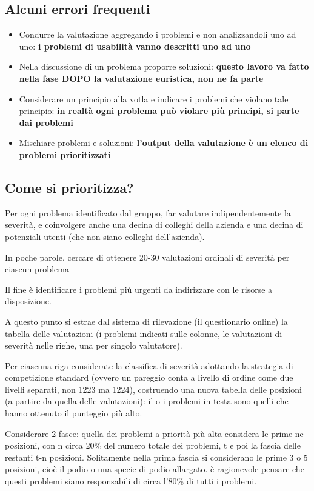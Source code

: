 \documentclass[11pt,a4paper]{book}
\begin{document}
\subsection{Alcuni errori frequenti}
\begin{itemize}
	\item Condurre la valutazione aggregando i problemi e non analizzandoli uno ad uno: \textbf{i problemi di usabilità vanno descritti uno ad uno}
	\item Nella discussione di un problema proporre soluzioni: \textbf{questo lavoro va fatto nella fase DOPO la valutazione euristica, non ne fa parte}
	\item Considerare un principio alla votla e indicare i problemi che violano tale principio: \textbf{in realtà ogni problema può violare più principi, si parte dai problemi}
	\item Mischiare problemi e soluzioni: \textbf{l'output della valutazione è un elenco di problemi prioritizzati}
\end{itemize}

\subsection{Come si prioritizza?}
Per ogni problema identificato dal gruppo, far valutare indipendentemente la severità, e coinvolgere anche una decina di colleghi della azienda e una decina di potenziali utenti (che non siano colleghi dell'azienda).

In poche parole, cercare di ottenere 20-30 valutazioni ordinali di severità per ciascun problema

Il fine è identificare i problemi più urgenti da indirizzare con le risorse a disposizione.

A questo punto si estrae dal sistema di rilevazione (il questionario online) la tabella delle valutazioni (i problemi indicati sulle colonne, le valutazioni di severità nelle righe, una per singolo valutatore).

Per ciascuna riga considerate la classifica di severità adottando la strategia di competizione standard (ovvero un pareggio conta a livello di ordine come due livelli separati, non 1223 ma 1224), costruendo una nuova tabella delle posizioni (a partire da quella delle valutazioni): il o i problemi in testa sono quelli che hanno ottenuto il punteggio più alto.

Considerare 2 fasce: quella dei problemi a priorità più alta considera le prime ne posizioni, con n circa 20\% del numero totale dei problemi, t e poi la fascia delle restanti t-n posizioni. Solitamente nella prima fascia si considerano le prime 3 o 5 posizioni, cioè il podio o una specie di podio allargato. è ragionevole pensare che questi problemi siano responsabili di circa l'80\% di tutti i problemi.
\end{document}

